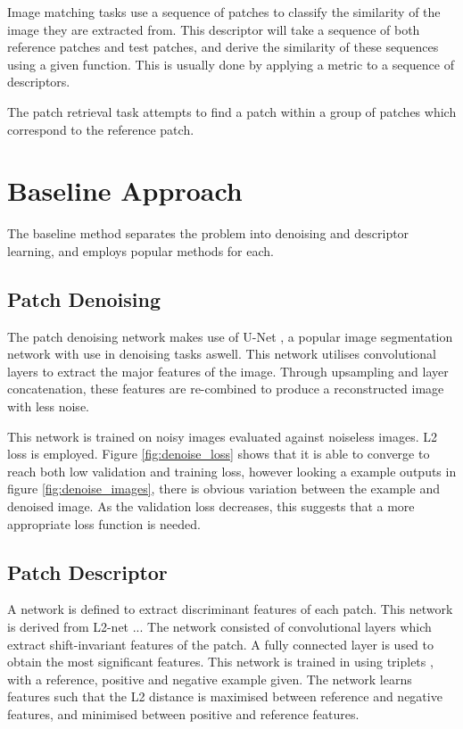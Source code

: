\documentclass[10pt,twocolumn,letterpaper]{article}
\begin{document}
Image matching tasks use a sequence of patches to classify the similarity of the image they are extracted from. This descriptor will take a sequence of both reference patches and test patches, and derive the similarity of these sequences using a given function. This is usually done by applying a metric to a sequence of descriptors.

The patch retrieval task attempts to find a patch within a group of patches which correspond to the reference patch.

\section{Baseline Approach}
The baseline method separates the problem into denoising and descriptor learning, and employs popular methods for each.


\subsection{Patch Denoising}
The patch denoising network makes use of U-Net \cite{RonnebergerFB15}, a popular image segmentation network with use in denoising tasks aswell. This network utilises convolutional layers to extract the major features of the image. Through upsampling and layer concatenation, these features are re-combined to produce a reconstructed image with less noise. 

This network is trained on noisy images evaluated against noiseless images. L2 loss is employed. Figure \ref{fig:denoise_loss} shows that it is able to converge to reach both low validation and training loss, however looking a example outputs in figure \ref{fig:denoise_images}, there is obvious variation between the example and denoised image. As the validation loss decreases, this suggests that a more appropriate loss function is needed.


\subsection{Patch Descriptor}
A network is defined to extract discriminant features of each patch. This network is derived from L2-net ... %
The network consisted of convolutional layers which extract shift-invariant features of the patch. A fully connected layer is used to obtain the most significant features. This network is trained in using triplets , with a reference, positive and negative example given. The network learns features such that the L2 distance is maximised between reference and negative features, and minimised between positive and reference features.
\end{document}
